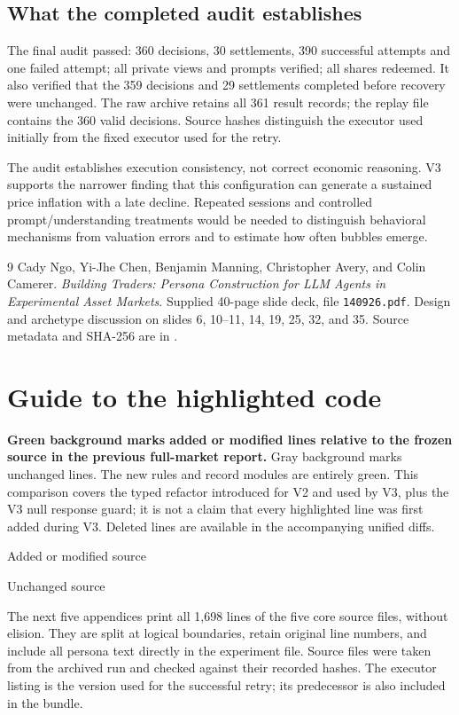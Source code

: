 \documentclass[11pt,letterpaper]{article}
\begin{document}
\subsection*{What the completed audit establishes}
The final audit passed: 360 decisions, 30 settlements, 390 successful attempts
and one failed attempt; all private views and prompts verified; all shares
redeemed. It also verified that the 359 decisions and 29 settlements completed
before recovery were unchanged. The raw archive retains all 361 result records;
the replay file contains the 360 valid decisions. Source hashes distinguish
the executor used initially from the fixed executor used for the retry.

The audit establishes execution consistency, not correct economic reasoning.
V3 supports the narrower finding that this configuration can generate a
sustained price inflation with a late decline. Repeated sessions and controlled
prompt/understanding treatments would be needed to distinguish behavioral
mechanisms from valuation errors and to estimate how often bubbles emerge.

\begin{thebibliography}{9}\small
{} Cady Ngo, Yi-Jhe Chen, Benjamin Manning, Christopher Avery,
and Colin Camerer. \emph{Building Traders: Persona Construction for LLM Agents
in Experimental Asset Markets}. Supplied 40-page slide deck, file
\texttt{140926.pdf}. Design and archetype discussion on slides 6, 10--11, 14,
19, 25, 32, and 35. Source metadata and SHA-256 are in
.
\end{thebibliography}

\clearpage\appendix
\section{Guide to the highlighted code}
\textbf{Green background marks added or modified lines relative to the frozen
source in the previous full-market report.} Gray background marks unchanged
lines. The new rules and record modules are entirely green. This comparison
covers the typed refactor introduced for V2 and used by V3, plus the V3 null
response guard; it is not a claim that every highlighted line was first added
during V3. Deleted lines are available in the accompanying unified diffs.

\colorbox{newbg}{\strut Added or modified source}\quad
\colorbox{codebg}{\strut Unchanged source}

The next five appendices print all 1,698 lines of the five core source files,
without elision. They are split at logical boundaries, retain original line
numbers, and include all persona text directly in the experiment file.
Source files were taken from the archived run and checked against their
recorded hashes. The executor listing is the version used for the successful
retry; its predecessor is also included in the bundle.
\end{document}
